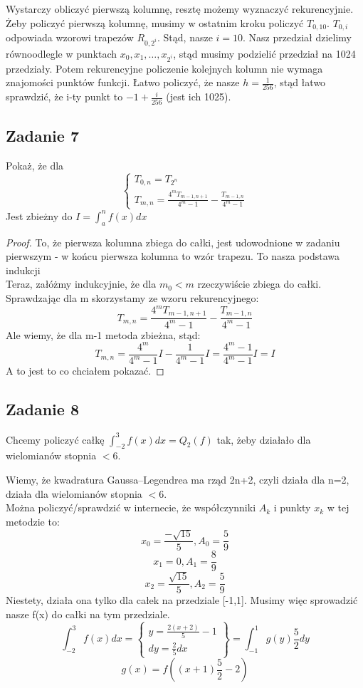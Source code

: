 \documentclass[a4paper]{article}
\begin{document}
Wystarczy obliczyć pierwszą kolumnę, resztę możemy wyznaczyć rekurencyjnie. Żeby policzyć pierwszą kolumnę, musimy w ostatnim kroku policzyć $T_{0,10}$. $T_{0,i}$ odpowiada wzorowi trapezów $R_{0,2^i}$. Stąd, nasze $i=10$. Nasz przedział dzielimy równoodlegle w punktach $x_0, x_1, \dots , x_{2^i}$, stąd musimy podzielić przedział na 1024 przedziały. Potem rekurencyjne policzenie kolejnych kolumn nie wymaga znajomości punktów funkcji. Łatwo policzyć, że nasze $h=\frac{1}{256}$, stąd łatwo sprawdzić, że i-ty punkt to $-1+\frac{i}{256}$ (jest ich 1025).

\subsection*{Zadanie 7}
Pokaż, że dla
$$\left\{ \begin{matrix}
 T_{0,n}=T_{2^n}\\
 T_{m,n}=\frac{4^m T_{m-1,n+1}}{4^m-1}-\frac{T_{m-1,n}}{4^m-1}
\end{matrix}\right.$$
Jest zbieżny do $I=\int_a^n f(x) dx$

\begin{proof}

To, że pierwsza kolumna zbiega do całki, jest udowodnione w zadaniu pierwszym - w końcu pierwsza kolumna to wzór trapezu. To nasza podstawa indukcji\\
Teraz, załóżmy indukcyjnie, że dla $m_0<m$ rzeczywiście zbiega do całki. Sprawdzając dla m skorzystamy ze wzoru rekurencyjnego:
$$T_{m,n}=\frac{4^m T_{m-1,n+1}}{4^m-1}-\frac{T_{m-1,n}}{4^m-1} $$
Ale wiemy, że dla m-1 metoda zbieżna, stąd:
$$T_{m,n}=\frac{4^m}{4^m-1}I-\frac{1}{4^m-1}I=\frac{4^m-1}{4^m-1}I=I $$
A to jest to co chciałem pokazać.
\end{proof}
\clearpage
\subsection*{Zadanie 8}
Chcemy policzyć całkę $\int_{-2}^3 f(x) dx = Q_2(f)$ tak, żeby działało dla wielomianów stopnia $<6$.

Wiemy, że kwadratura Gaussa–Legendrea ma rząd 2n+2, czyli działa dla n=2, działa dla wielomianów stopnia $<6$.\\
Można policzyć/sprawdzić w internecie, że współczynniki $A_k$ i punkty $x_k$ w tej metodzie to:\\
$$x_0=\frac{-\sqrt{15}}{5}, A_0=\frac{5}{9}$$
$$x_1=0, A_1=\frac{8}{9}$$
$$x_2=\frac{\sqrt{15}}{5}, A_2=\frac{5}{9}$$
Niestety, działa ona tylko dla całek na przedziale [-1,1]. Musimy więc sprowadzić nasze f(x) do całki na tym przedziale.
$$\int_{-2}^3f(x) dx = \begin{Bmatrix}
y=\frac{2(x+2)}{5}-1\\
dy=\frac{2}{5} dx
\end{Bmatrix} =\int_{-1}^1 g(y) \frac{5}{2} dy$$
$$g(x)=f((x+1)\frac{5}{2}-2) $$
\end{document}
